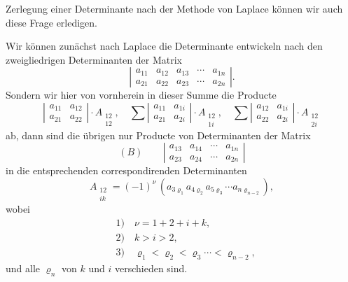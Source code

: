 
Zerlegung einer Determinante nach der Methode von Laplace können wir auch diese Frage erledigen.

Wir können zunächst nach Laplace die Determinante entwickeln nach den zweigliedrigen Determinanten der Matrix
\[
\left|\begin{array}{ccccc}
a_{11} & a_{12} & a_{13} & \cdots & a_{1n}\\
a_{21} & a_{22} & a_{23} & \cdots & a_{2n}
\end{array}\right|.
\]
Sondern wir hier von vornherein in dieser Summe die Producte
\[
\left|\begin{array}{cc} a_{11} & a_{12}\\ a_{21} & a_{22}\end{array}\right|\cdot A_{\substack{12\\12}},\quad
\sum\left|\begin{array}{cc} a_{11} & a_{1i}\\ a_{21} & a_{2i}\end{array}\right|\cdot A_{\substack{12\\1i}},\quad
\sum\left|\begin{array}{cc} a_{12} & a_{1i}\\ a_{22} & a_{2i}\end{array}\right|\cdot A_{\substack{12\\2i}}
\]
ab, dann sind die übrigen nur Producte von Determinanten der Matrix
\[
(B)\qquad \left|\begin{array}{cccc} a_{13} & a_{14} & \cdots & a_{1n}\\ a_{23} & a_{24} & \cdots & a_{2n}\end{array}\right|
\]
in die entsprechenden correspondirenden Determinanten
\[
A_{\substack{12\\ik}} = (-1)^{\nu}\,(a_{3\varrho_1} a_{4\varrho_2} a_{5\varrho_3} \cdots a_{n\varrho_{n-2}}),
\]
wobei
\[
\begin{aligned}
&\text{1)}\quad \nu = 1+2+i+k,\\
&\text{2)}\quad k>i>2,\\
&\text{3)}\quad \varrho_1<\varrho_2<\varrho_3\cdots<\varrho_{n-2},
\end{aligned}
\]
und alle $\varrho_n$ von $k$ und $i$ verschieden sind.

